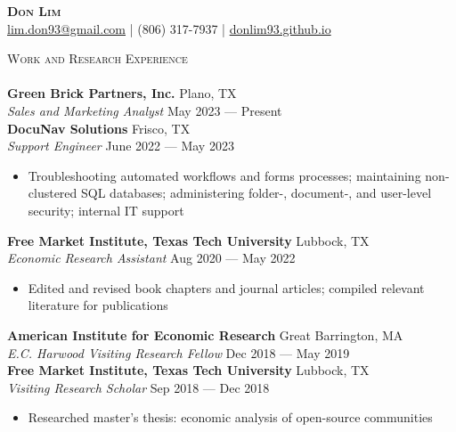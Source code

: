 \documentclass[a4paper,11pt]{article}
\newcommand{\lineunder} {
    \vspace*{-8pt} \\
    \hspace*{-18pt} \hrulefill \\
}
\newcommand{\header} [1] {
    {\hspace*{-18pt}\vspace*{6pt} \textsc{\large{#1}}}
    \vspace*{-6pt} \lineunder
}
\begin{document}
\vspace*{-40pt}
\fontsize{10.5}{12}\selectfont

\vspace*{-10pt}
\begin{center}
    {\Huge\textbf\textsc{{{Don Lim}}}}\\
    \href{mailto:lim.don93@gmail.com}{\Letter\space lim.don93@gmail.com} | \Mobilefone\space (806) 317-7937 | \href{https://donlim93.github.io/}{\space donlim93.github.io} \\
\end{center}

\header{Work and Research Experience}
\textbf{Green Brick Partners, Inc.} \hfill \faMapMarker\space Plano, TX \\
\textit{Sales and Marketing Analyst} \hfill May 2023 --- Present \\

\textbf{DocuNav Solutions} \hfill \faMapMarker\space Frisco, TX \\
\textit{Support Engineer} \hfill June 2022 --- May 2023 \\
\begin{itemize}
    \item Troubleshooting automated workflows and forms processes; maintaining non-clustered SQL databases; administering folder-, document-, and user-level security; internal IT support
\end{itemize}    

\textbf{Free Market Institute, Texas Tech University} \hfill \faMapMarker\space Lubbock, TX\\
\textit{Economic Research Assistant} \hfill Aug 2020 --- May 2022 \\
\begin{itemize}
    \item Edited and revised book chapters and journal articles; compiled relevant literature for publications
\end{itemize}

\textbf{American Institute for Economic Research} \hfill \faMapMarker\space Great Barrington, MA\\
\textit{E.C. Harwood Visiting Research Fellow} \hfill Dec 2018 --- May 2019\\

\textbf{Free Market Institute, Texas Tech University} \hfill \faMapMarker\space Lubbock, TX\\
\textit{Visiting Research Scholar} \hfill Sep 2018 --- Dec 2018\\
\begin{itemize}
    \item Researched master's thesis: economic analysis of open-source communities
\end{itemize}
\end{document}
